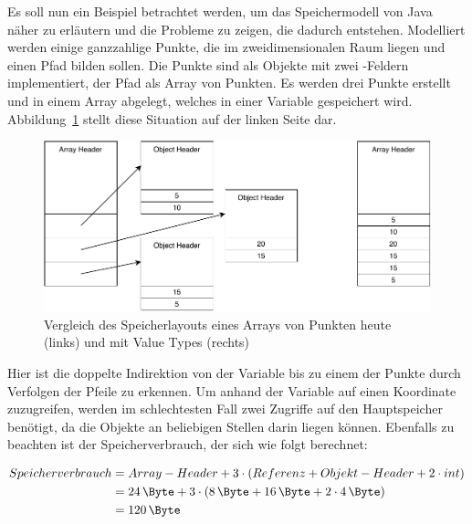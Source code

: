 Es soll nun ein Beispiel betrachtet werden, um das Speichermodell von Java näher zu erläutern und die Probleme zu zeigen, die dadurch entstehen.
Modelliert werden einige ganzzahlige Punkte, die im zweidimensionalen Raum liegen und einen Pfad bilden sollen.
Die Punkte sind als Objekte mit zwei -Feldern implementiert, der Pfad als Array von Punkten.
Es werden drei Punkte erstellt und in einem Array abgelegt, welches in einer Variable gespeichert wird.
Abbildung~\ref{fig:memory-usage} stellt diese Situation auf der linken Seite dar.

\begin{figure}[htp]
    \centering
    \includegraphics[width=\textwidth]{img/memory-usage.pdf}
    \vspace{-3ex}
    \caption{Vergleich des Speicherlayouts eines Arrays von Punkten heute (links) und mit Value Types (rechts)}
    \label{fig:memory-usage}
\end{figure}

Hier ist die doppelte Indirektion von der Variable bis zu einem der Punkte durch Verfolgen der Pfeile zu erkennen.
Um anhand der Variable auf einen Koordinate zuzugreifen, werden im schlechtesten Fall zwei Zugriffe auf den Hauptspeicher benötigt, da die Objekte an beliebigen Stellen darin liegen können.
Ebenfalls zu beachten ist der Speicherverbrauch, der sich wie folgt berechnet:

\begin{equation}
    \begin{split}
    Speicherverbrauch & = Array-Header + 3 \cdot (Referenz + Objekt-Header + 2 \cdot int) \\
    & = \SI{24}{\Byte} + 3 \cdot (\SI{8}{\Byte} + \SI{16}{\Byte} + 2 \cdot \SI{4}{\Byte}) \\
    & = \SI{120}{\Byte}\label{eq:memory-usage-current} \\
    \end{split}
\end{equation}

